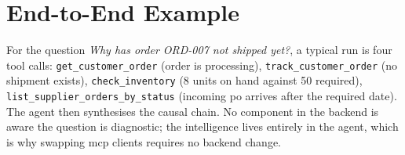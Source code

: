 \section{End-to-End Example}

For the question \emph{Why has order ORD-007 not shipped yet?}, a typical run is four tool calls: \texttt{get\_customer\_order} (order is processing), \texttt{track\_customer\_order} (no shipment exists), \texttt{check\_inventory} (8 units on hand against 50 required), \texttt{list\_supplier\_orders\_by\_status} (incoming \gls{po} arrives after the required date). The agent then synthesises the causal chain. No component in the backend is aware the question is diagnostic; the intelligence lives entirely in the agent, which is why swapping \gls{mcp} clients requires no backend change.
